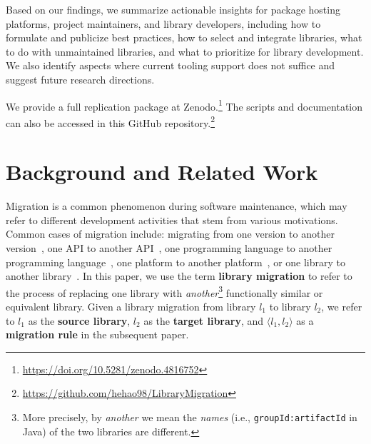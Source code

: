 \documentclass[sigconf, screen]{acmart}
\begin{document}
Based on our findings, we summarize actionable insights for package hosting platforms, project maintainers, and library developers, including how to formulate and publicize best practices, how to select and integrate libraries, what to do with unmaintained libraries, and what to prioritize for library development.
We also identify aspects where current tooling support does not suffice and suggest future research directions. 

We provide a full replication package at Zenodo.\footnote{ \url{https://doi.org/10.5281/zenodo.4816752}} 
The scripts and documentation can also be accessed in this GitHub repository.\footnote{\url{https://github.com/hehao98/LibraryMigration}}

\section{Background and Related Work}
\label{sec:background}

Migration is a common phenomenon during software maintenance, which may refer to different development activities that stem from various motivations.
Common cases of migration include: migrating from one version to another version~\cite{kula2018developers}, one API to another API~\cite{alrubaye2019use}, one programming language to another programming language~\cite{zhong2010mining}, one platform to another platform~\cite{verhaeghe2019gui}, or one library to another library~\cite{teyton2012mining, teyton2014study, kabinna2016logging, he2021multi}.
In this paper, we use the term \textbf{library migration} to refer to the process of replacing one library with \textit{another}\footnote{More precisely, by \textit{another} we mean the \textit{names} (i.e., \texttt{groupId:artifactId} in Java) of the two libraries are different.} functionally similar or equivalent library. 
Given a library migration from library $l_1$ to library $l_2$, we refer to $l_1$ as the \textbf{source library}, $l_2$ as the \textbf{target library}, and $\langle l_1, l_2 \rangle$ as a \textbf{migration rule} in the subsequent paper.
\end{document}
